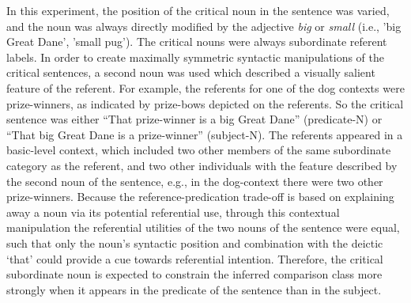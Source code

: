 In this experiment, the position of the critical noun in the sentence was varied, and the noun was always directly modified by the adjective \textit{big} or \textit{small} (i.e., 'big Great Dane', 'small pug'). The critical nouns were always subordinate referent labels. In order to create maximally symmetric syntactic manipulations of the critical sentences, a second noun was used which described a visually salient feature of the referent. For example, the referents for one of the dog contexts were prize-winners, as indicated by prize-bows depicted on the referents. So the critical sentence was either “That prize-winner is a big Great Dane” (predicate-N) or “That big Great Dane is a prize-winner” (subject-N). 
The referents appeared in a basic-level context, which included two other members of the same subordinate category as the referent, and two other individuals with the feature described by the second noun of the sentence, e.g., in the dog-context there were two other prize-winners.  Because the reference-predication trade-off is based on explaining away a noun via its potential referential use, through this contextual manipulation the referential utilities of the two nouns of the sentence were equal, such that only the noun’s syntactic position and combination with the deictic ‘that’ could provide a cue towards referential intention. Therefore, the critical subordinate noun is expected to constrain the inferred comparison class more strongly when it appears in the predicate of the sentence than in the subject.   

